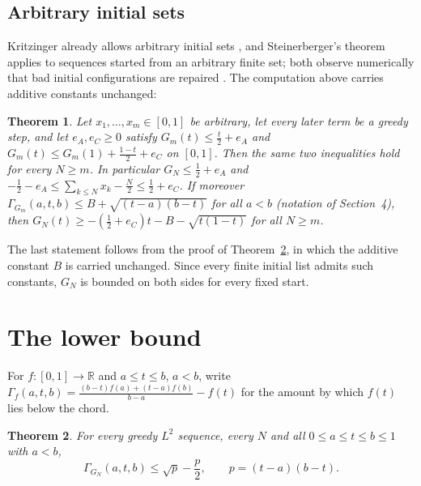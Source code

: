 \documentclass[11pt]{amsart}
\newtheorem{theorem}{Theorem}
\theoremstyle{remark}
\begin{document}
\subsection*{Arbitrary initial sets}
Kritzinger already allows arbitrary initial sets \cite[Remark 1]{Kri}, and
Steinerberger's theorem applies to sequences started from an arbitrary finite
set; both observe numerically that bad initial configurations are repaired
\cite{Ste,Cle}. The computation above carries additive constants unchanged:

\begin{theorem}\label{thm:start}
Let $x_1,\dots,x_m\in[0,1]$ be arbitrary, let every later term be a greedy
step, and let $e_A,e_C\ge0$ satisfy $G_m(t)\le\frac t2+e_A$ and
$G_m(t)\le G_m(1)+\frac{1-t}{2}+e_C$ on $[0,1]$. Then the same two
inequalities hold for every $N\ge m$. In particular $G_N\le\frac12+e_A$ and
$-\tfrac12-e_A\le \sum_{k\le N}x_k-\tfrac N2\le\tfrac12+e_C$. If moreover
$\Gamma_{G_m}(a,t,b)\le B+\sqrt{(t-a)(b-t)}$ for all $a<b$ (notation of
Section~4), then $G_N(t)\ge-(\tfrac12+e_C)t-B-\sqrt{t(1-t)}$ for all $N\ge m$.
\end{theorem}

The last statement follows from the proof of Theorem~\ref{thm:chord}, in which
the additive constant $B$ is carried unchanged. Since every finite initial list
admits such constants, $G_N$ is bounded on both sides for every fixed start.

\section{The lower bound}

For $f:[0,1]\to\mathbb R$ and $a\le t\le b$, $a<b$, write
$\Gamma_f(a,t,b)=\frac{(b-t)f(a)+(t-a)f(b)}{b-a}-f(t)$ for the amount by which
$f(t)$ lies below the chord.

\begin{theorem}\label{thm:chord}
For every greedy $L^2$ sequence, every $N$ and all $0\le a\le t\le b\le 1$
with $a<b$,
\[
\Gamma_{G_N}(a,t,b)\le\sqrt{p}-\frac p2,\qquad p=(t-a)(b-t) .
\]
\end{theorem}
\end{document}
